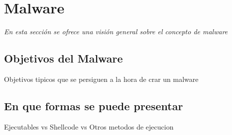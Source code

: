 \chapter{Malware}

\textit{En esta sección se ofrece una visión general sobre el concepto de malware}
\vspace{1em}

\section{Objetivos del Malware}

Objetivos tipicos que se persiguen a la hora de crar un malware

\section{En que formas se puede presentar}

Ejecutables vs Shellcode vs Otros metodos de ejecucion
